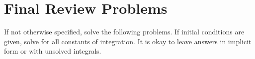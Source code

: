 \documentclass[letterpaper, fontsize=11pt]{scrartcl} %
\numberwithin{equation}{section} %
\numberwithin{figure}{section} %
\numberwithin{table}{section} %
\begin{document}

\newcommand{\horrule}[1]{\rule{\linewidth}{#1}} %


\section*{Final Review Problems}
\par If not otherwise specified, solve the following problems. If initial conditions are given, solve for all constants of integration. It is okay to leave answers in implicit form or with unsolved integrals. 
\end{document}
